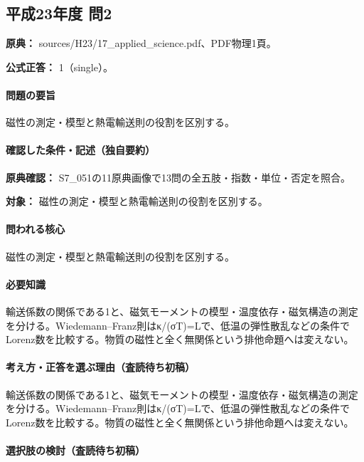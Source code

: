 \subsection{平成23年度 問2}
\label{q:h23-reg-applied-02}

\noindent\textbf{原典：} sources/H23/17\_applied\_science.pdf、PDF物理1頁。

\textbf{公式正答：} 1（single）。

\paragraph{問題の要旨} 磁性の測定・模型と熱電輸送則の役割を区別する。

\paragraph{確認した条件・記述（独自要約）}\mbox{}\par

\noindent\textbf{原典確認：} S7\_051の11原典画像で13問の全五肢・指数・単位・否定を照合。\par

\noindent\textbf{対象：} 磁性の測定・模型と熱電輸送則の役割を区別する。\par

\paragraph{問われる核心} 磁性の測定・模型と熱電輸送則の役割を区別する。

\paragraph{必要知識} 輸送係数の関係である1と、磁気モーメントの模型・温度依存・磁気構造の測定を分ける。Wiedemann–Franz則はκ/(σT)=\allowbreak{}Lで、低温の弾性散乱などの条件でLorenz数を比較する。物質の磁性と全く無関係という排他命題へは変えない。

\paragraph{考え方・正答を選ぶ理由（査読待ち初稿）} 輸送係数の関係である1と、磁気モーメントの模型・温度依存・磁気構造の測定を分ける。Wiedemann–Franz則はκ/(σT)=\allowbreak{}Lで、低温の弾性散乱などの条件でLorenz数を比較する。物質の磁性と全く無関係という排他命題へは変えない。

\paragraph{選択肢の検討（査読待ち初稿）}\mbox{}\par

